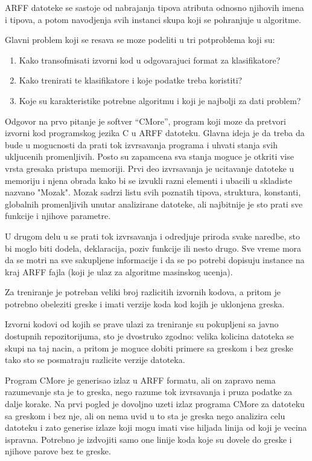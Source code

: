 \documentclass[a4paper]{article}
\begin{document}
{ARFF datoteke se sastoje od nabrajanja tipova atributa odnosno njihovih imena i tipova, a potom navodjenja svih instanci skupa koji se pohranjuje u algoritme.

Glavni problem koji se resava se moze podeliti u tri potproblema koji su:
\begin{enumerate}
\item Kako transofmisati izvorni kod u odgovarajuci format za klasifikatore?
\item Kako trenirati te klasifikatore i koje podatke treba koristiti?
\item Koje su karakteristike potrebne algoritmu i koji je najbolji za dati problem?
\end{enumerate}


Odgovor na prvo pitanje je softver ``CMore'', program koji moze da pretvori izvorni kod programskog
jezika C u ARFF datoteku. Glavna ideja je da treba da bude u mogucnosti da prati tok izvrsavanja programa
i uhvati stanja svih ukljucenih promenljivih. Posto su zapamcena sva stanja moguce je otkriti vise vrsta 
gresaka pristupa memoriji.
Prvi 
deo izvrsavanja je ucitavanje datoteke u memoriju i njena obrada kako bi se izvukli
razni elementi i ubacili u skladiste nazvano "Mozak".
Mozak sadrzi listu svih poznatih tipova, struktura, konstanti, globalnih promenljivih unutar analizirane datoteke,
ali najbitnije je sto prati sve funkcije i njihove parametre.

U drugom delu u se prati tok izvrsavanja i odredjuje
priroda svake naredbe, sto bi moglo biti dodela, deklaracija, poziv funkcije ili nesto drugo.
Sve vreme mora da se motri na sve sakupljene informacije i da se po potrebi dopisuju instance na kraj ARFF fajla
(koji je ulaz za algoritme masinskog ucenja).


Za treniranje je potreban veliki broj razlicitih izvornih kodova, a pritom je potrebno obeleziti greske i imati verzije koda kod kojih je uklonjena greska.

Izvorni kodovi od kojih se prave ulazi za treniranje su pokupljeni sa javno dostupnih repozitorijuma, sto je dvostruko zgodno:
velika kolicina datoteka se skupi na taj nacin, a pritom je moguce dobiti primere sa greskom i bez greske tako sto se posmatraju razlicite verzije datoteka.

Program CMore je generisao izlaz u ARFF formatu, ali on zapravo nema razumevanje sta je to greska, nego razume tok izvrsavanja i pruza podatke
za dalje korake.
Na prvi pogled je dovoljno uzeti izlaz programa CMore za datoteku sa greskom i bez nje, ali on nema uvid u to sta je greska nego analizira celu datoteku i zato
generise izlaze koji mogu imati vise hiljada linija od koji je vecina ispravna.
Potrebno je izdvojiti samo one linije koda koje su dovele do greske i njihove parove bez te greske.

}
\end{document}
